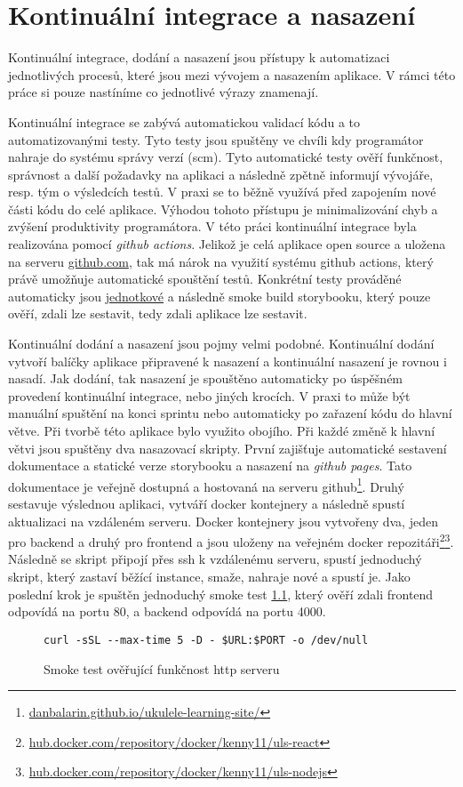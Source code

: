 \chapter{Kontinuální integrace a nasazení}
\label{ch:ci_cd}
Kontinuální integrace, dodání a nasazení jsou přístupy k automatizaci jednotlivých procesů, které jsou mezi vývojem a nasazením aplikace. V rámci této práce si pouze nastíníme co jednotlivé výrazy znamenají.

Kontinuální integrace se zabývá automatickou validací kódu a to automatizovanými testy. Tyto testy jsou spuštěny ve chvíli kdy programátor nahraje do systému správy verzí (\acrshort{scm}). Tyto automatické testy ověří funkčnost, správnost a další požadavky na aplikaci a následně zpětně informují vývojáře, resp. tým o výsledcích testů. V praxi se to běžně využívá před zapojením nové části kódu do celé aplikace. Výhodou tohoto přístupu je minimalizování chyb a zvýšení produktivity programátora. V této práci kontinuální integrace byla realizována pomocí \emph{github actions}. Jelikož je celá aplikace open source a uložena na serveru \href{www.github.com}{github.com}, tak má nárok na využití systému github actions, který právě umožňuje automatické spouštění testů. Konkrétní testy prováděné automaticky jsou \hyperref[sc:unit_tests]{jednotkové} a následně smoke build storybooku, který pouze ověří, zdali lze sestavit, tedy zdali aplikace lze sestavit.

Kontinuální dodání a nasazení jsou pojmy velmi podobné. Kontinuální dodání vytvoří balíčky aplikace připravené k nasazení a kontinuální nasazení je rovnou i nasadí. Jak dodání, tak nasazení je spouštěno automaticky po úspěšném provedení kontinuální integrace, nebo jiných krocích. V praxi to může být manuální spuštění na konci sprintu nebo automaticky po zařazení kódu do hlavní větve. Při tvorbě této aplikace bylo využito obojího. Při každé změně k hlavní větvi jsou spuštěny dva nasazovací skripty. První zajišťuje automatické sestavení dokumentace a statické verze storybooku a nasazení na \emph{github pages}. Tato dokumentace je veřejně dostupná a hostovaná na serveru github\footnote{\href{https://danbalarin.github.io/ukulele-learning-site/}{danbalarin.github.io/ukulele-learning-site/}}. Druhý sestavuje výslednou aplikaci, vytváří docker kontejnery a následně spustí aktualizaci na vzdáleném serveru. Docker kontejnery jsou vytvořeny dva, jeden pro backend a druhý pro frontend a jsou uloženy na veřejném docker repozitáři\footnote{\href{https://hub.docker.com/repository/docker/kenny11/uls-react}{hub.docker.com/repository/docker/kenny11/uls-react}}\footnote{\href{https://hub.docker.com/repository/docker/kenny11/uls-nodejs}{hub.docker.com/repository/docker/kenny11/uls-nodejs}}. Následně se skript připojí přes ssh k vzdálenému serveru, spustí jednoduchý skript, který zastaví běžící instance, smaže, nahraje nové a spustí je. Jako poslední krok je spuštěn jednoduchý smoke test \ref{code:smoke}, který ověří zdali frontend odpovídá na portu 80, a backend odpovídá na portu 4000.

\begin{figure}[h!]
    \centering
    \begin{verbatim}
curl -sSL --max-time 5 -D - $URL:$PORT -o /dev/null
    \end{verbatim}
    \caption{Smoke test ověřující funkčnost http serveru}
    \label{code:smoke}
\end{figure}
